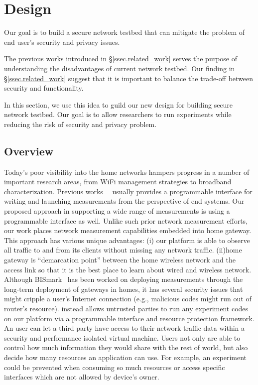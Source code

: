 \chapter{\sysname Design}
\label{sec.design}
Our goal is to build a secure network testbed that can mitigate the problem 
of end user's security and privacy issues. 

The previous works introduced in \S{\ref{ssec.related_work}} serves the 
purpose of understanding the disadvantages of current network testbed. Our 
finding in \S{\ref{ssec.related_work}} suggest that it is important to 
balance the trade-off between security and functionality.

In this section, we use this idea to guild our new design for building 
secure network testbed. Our goal is to allow researchers to run experiments 
while reducing the risk of security and privacy problem.

\section{Overview}
Today's poor visibility into the home networks hampers progress in a number of important research areas, from WiFi management strategies to broadband characterization. Previous works~\cite{sanchez2014measurement}~\cite{dhawan2012fathom} usually provides a programmable interface for writing and launching measurements from the perspective of end systems. Our proposed approach in supporting a wide range of measurements is using a programmable interface as well. Unlike such prior network measurement efforts, our work places network measurement capabilities embedded into home gateway. This approach has various unique advantages: (i) our platform is able to observe all traffic to and from its clients without missing any network traffic. (ii)home gateway is “demarcation point” between the home wireless network and the access link so that it is the best place to learn about wired and wireless network. Although BISmark~\cite{183951} has been worked on deploying measurements through the long-term deployment of gateways in homes, it has several security issues that might cripple a user's Internet connection (e.g., malicious codes might run out of router's resource). \sysname instead allows untrusted parties to run any experiment codes on our platform via a programmable interface and resource protection framework. An user can let a third party have access to their network traffic data within a security and performance isolated virtual machine. Users not only are able to control how much information they would share with the rest of world, but also decide how many resources an application can use. For example, an experiment could be prevented when consuming so much resources or access specific interfaces which are not allowed by device's owner. 


